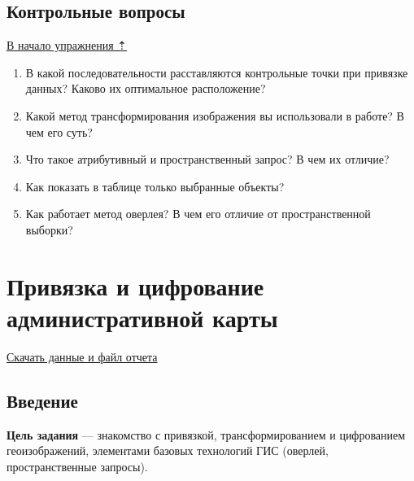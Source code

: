 \documentclass[]{book}
\theoremstyle{definition}
\theoremstyle{definition}
\theoremstyle{definition}
\theoremstyle{remark}
\begin{document}
\hypertarget{map-ref-hydrogeologic-questions}{%
\section{Контрольные вопросы}\label{map-ref-hydrogeologic-questions}}

\protect\hyperlink{map-ref-hydrogeologic}{В начало упражнения ⇡}

\begin{enumerate}
\def\labelenumi{\arabic{enumi}.}
\item
  В какой последовательности расставляются контрольные точки при
  привязке данных? Каково их оптимальное расположение?
\item
  Какой метод трансформирования изображения вы использовали в работе? В
  чем его суть?
\item
  Что такое атрибутивный и пространственный запрос? В чем их отличие?
\item
  Как показать в таблице только выбранные объекты?
\item
  Как работает метод оверлея? В чем его отличие от пространственной
  выборки?
\end{enumerate}

\hypertarget{map-ref-economic}{%
\chapter{Привязка и цифрование административной
карты}\label{map-ref-economic}}

\href{http://autolab.geogr.msu.ru/gis/data/Ex07.zip}{Скачать данные и
файл отчета}

\hypertarget{map-ref-economic-intro}{%
\section{Введение}\label{map-ref-economic-intro}}

\textbf{Цель задания} --- знакомство с привязкой, трансформированием и
цифрованием геоизображений, элементами базовых технологий ГИС (оверлей,
пространственные запросы).
\end{document}

